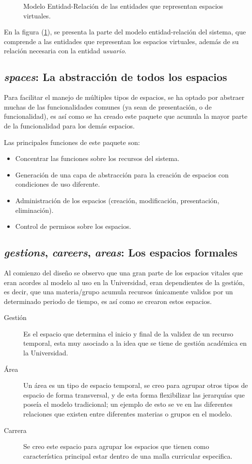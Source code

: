 \begin{figure}
\centering

\caption{Modelo Entidad-Relación de las entidades que representan espacios
virtuales.}
\label{modelo2}
\end{figure}

En la figura (\ref{modelo2}), se presenta la parte del modelo entidad-relación
del sistema, que comprende a las entidades que representan los espacios
virtuales, además de su relación necesaria con la entidad \emph{usuario}.

\subsection{\emph{spaces}: La abstracción de todos los espacios}
Para facilitar el manejo de múltiples tipos de espacios, se ha optado por
abstraer muchas de las funcionalidades comunes (ya sean de presentación, o de
funcionalidad), es así como se ha creado este paquete que acumula la mayor parte
de la funcionalidad para los demás espacios.

Las principales funciones de este paquete son:

\begin{itemize}
\item Concentrar las funciones sobre los recursos del sistema.
\item Generación de una capa de abstracción para la creación de espacios con
condiciones de uso diferente.
\item Administración de los espacios (creación, modificación, presentación,
eliminación).
\item Control de permisos sobre los espacios.
\end{itemize}

\subsection{\emph{gestions}, \emph{careers}, \emph{areas}: Los espacios
formales}
Al comienzo del diseño se observo que una gran parte de los espacios vitales que
eran acordes al modelo al uso en la Universidad, eran dependientes de la
gestión, es decir, que una materia/grupo acumula recursos únicamente validos por
un determinado periodo de tiempo, es así como se crearon estos espacios.

\begin{description}
\item [Gestión] Es el espacio que determina el inicio y final de la validez de
un recurso temporal, esta muy asociado a la idea que se tiene de gestión
académica en la Universidad.
\item [Área] Un área es un tipo de espacio temporal, se creo para agrupar otros
tipos de espacio de forma transversal, y de esta forma flexibilizar las
jerarquías que poseía el modelo tradicional; un ejemplo de esto se ve en las
diferentes relaciones que existen entre diferentes materias o grupos en el
modelo.
\item [Carrera] Se creo este espacio para agrupar los espacios que tienen como
característica principal estar dentro de una malla curricular especifica.
\end{description}

